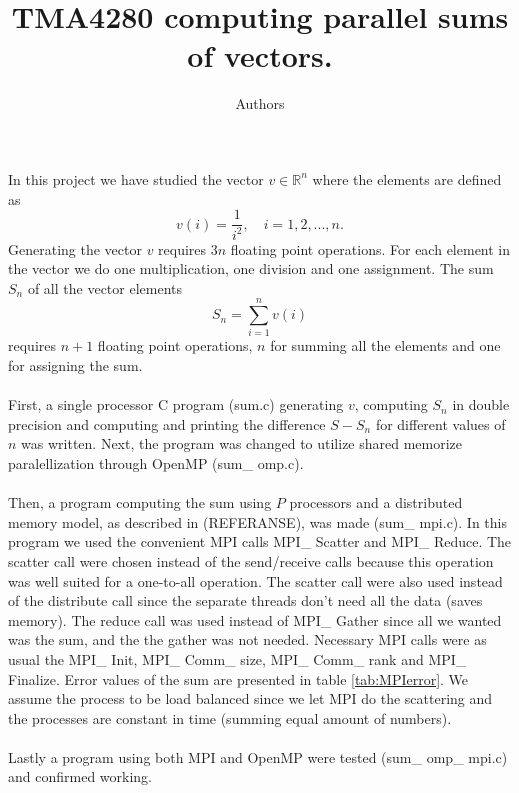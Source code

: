 \documentclass{article}
\title{TMA4280 computing parallel sums of vectors.}
\author{Authors}
\begin{document}
\maketitle
In this project we have studied the vector $v \in \mathbb{R}^n$ where the elements are defined as 
\begin{equation}
\label{vdefinition}
	v(i) =\frac{1}{i^2},\quad i = 1,2,...,n.
\end{equation}
Generating the vector $v$ requires $3n$ floating point operations. For each element in the vector we do one multiplication, one division and one assignment.  
The sum $S_n$ of all the vector elements 
\begin{equation}
\label{Sdefinition}
	S_n = \sum_{i=1}^n v(i)
\end{equation}
requires $n+1$ floating point operations, $n$ for summing all the elements and one for assigning the sum.\\
\\
First, a single processor C program (sum.c) generating $v$, computing $S_n$ in double precision and computing and printing the difference $S - S_n$ for different values of $n$ was written. Next, the program was changed to utilize shared memorize paralellization through OpenMP (sum\_ omp.c). \\
\\
Then, a program computing the sum using $P$ processors and a distributed memory model, as described in (REFERANSE), was made (sum\_ mpi.c). In this program we used the convenient MPI calls MPI\_ Scatter and MPI\_ Reduce. The scatter call were chosen instead of the send/receive calls because this operation was well suited for a one-to-all operation. The scatter call were also used instead of the distribute call since the separate threads don't need all the data (saves memory). The reduce call was used instead of MPI\_ Gather since all we wanted was the sum, and the the gather was not needed. Necessary MPI calls were as usual the MPI\_ Init, MPI\_ Comm\_ size, MPI\_ Comm\_ rank and MPI\_ Finalize. Error values of the sum are presented in table \ref{tab:MPIerror}. We assume the process to be load balanced since we let MPI do the scattering and the processes are constant in time (summing equal amount of numbers).\\
\\
Lastly a program using both MPI and OpenMP were tested (sum\_ omp\_ mpi.c) and confirmed working.
\end{document}
